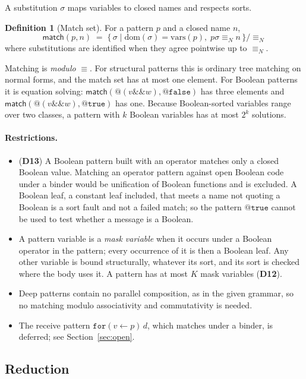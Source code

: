 \documentclass[10.5pt,a4paper]{extarticle}
\makeatletter
\newcommand{\kw}[1]{\texttt{#1}}
\newcommand{\tru}{\kw{true}}
\newcommand{\fls}{\kw{false}}
\newcommand{\band}{\mathbin{\&\&}}
\newcommand{\quo}[1]{@#1}
\newcommand{\for}[3]{\kw{for}(#1 \leftarrow #2)\,#3}
\newcommand{\scong}{\equiv}
\newcommand{\nameq}{\equiv_N}
\newcommand{\dec}[1]{\textbf{D#1}}
\theoremstyle{definition}
\newtheorem{definition}{Definition}
\theoremstyle{remark}
\makeatother
\begin{document}
A substitution $\sigma$ maps variables to closed names and respects sorts.
\begin{definition}[Match set]
For a pattern $p$ and a closed name $n$,
\[
\mathsf{match}(p,n) \;=\; \{\, \sigma \mid \mathrm{dom}(\sigma)=\mathrm{vars}(p),\;
p\sigma \nameq n \,\}\big/{\nameq}
\]
where substitutions are identified when they agree pointwise up to $\nameq$.
\end{definition}
Matching is \emph{modulo} $\scong$. For structural patterns this is ordinary
tree matching on normal forms, and the match set has at most one element. For
Boolean patterns it is equation solving: $\mathsf{match}(\quo{(v \band w)},
\quo{\fls})$ has three elements and $\mathsf{match}(\quo{(v \band w)},
\quo{\tru})$ has one. Because Boolean-sorted variables range over two classes,
a pattern with $k$ Boolean variables has at most $2^k$ solutions.

\paragraph{Restrictions.}
\begin{itemize}
\item (\dec{13}) A Boolean pattern built with an operator matches only a
closed Boolean value. Matching an operator pattern against open Boolean code
under a binder would be unification of Boolean functions and is excluded. A Boolean
leaf, a constant leaf included, that meets a name not quoting a Boolean is a
sort fault and not a failed match; so the pattern $\quo{\tru}$ cannot be used
to test whether a message is a Boolean.
\item A pattern variable is a \emph{mask variable} when it occurs under a
Boolean operator in the pattern; every occurrence of it is then a Boolean
leaf. Any other variable is bound structurally, whatever its sort, and its
sort is checked where the body uses it. A pattern has at most $K$ mask
variables (\dec{12}).
\item Deep patterns contain no parallel composition, as in the given
grammar, so no matching modulo associativity and commutativity is needed.
\item The receive pattern $\for{v}{p}{d}$, which matches under a binder, is
deferred; see Section~\ref{sec:open}.
\end{itemize}

\subsection{Reduction}\label{sec:reduction}
\end{document}
